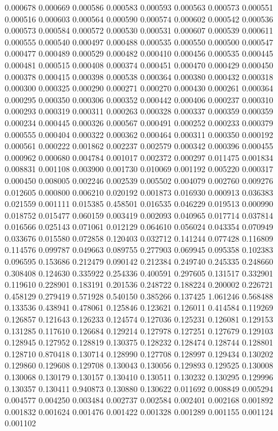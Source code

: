 0.000678
0.000669
0.000586
0.000583
0.000593
0.000563
0.000573
0.000551
0.000516
0.000603
0.000564
0.000590
0.000574
0.000602
0.000542
0.000536
0.000573
0.000584
0.000572
0.000530
0.000531
0.000607
0.000539
0.000611
0.000555
0.000540
0.000497
0.000488
0.000535
0.000550
0.000500
0.000547
0.000477
0.000489
0.000529
0.000482
0.000410
0.000456
0.000535
0.000445
0.000481
0.000515
0.000408
0.000374
0.000451
0.000470
0.000429
0.000450
0.000378
0.000415
0.000398
0.000538
0.000364
0.000380
0.000432
0.000318
0.000300
0.000325
0.000290
0.000271
0.000270
0.000430
0.000261
0.000364
0.000295
0.000350
0.000306
0.000352
0.000442
0.000406
0.000237
0.000310
0.000293
0.000319
0.000311
0.000263
0.000328
0.000337
0.000359
0.000359
0.000234
0.000445
0.000326
0.000567
0.000491
0.000252
0.000233
0.000379
0.000555
0.000404
0.000322
0.000362
0.000464
0.000311
0.000350
0.000192
0.000561
0.000222
0.001862
0.002237
0.002579
0.000342
0.000396
0.000455
0.000962
0.000680
0.004784
0.001017
0.002372
0.000297
0.011475
0.001834
0.008831
0.001108
0.003900
0.001730
0.010069
0.001192
0.005220
0.000317
0.000450
0.008005
0.002246
0.002539
0.005502
0.004079
0.002760
0.009276
0.012605
0.000800
0.006210
0.020192
0.001873
0.016930
0.000913
0.036383
0.021559
0.001111
0.015385
0.458501
0.016535
0.046229
0.019513
0.000990
0.018752
0.015477
0.060159
0.003419
0.002093
0.040965
0.017714
0.037814
0.016566
0.025143
0.071061
0.012129
0.064610
0.056024
0.043354
0.070949
0.033676
0.015580
0.072858
0.120403
0.032712
0.141244
0.077428
0.116809
0.114576
0.099787
0.049663
0.089755
0.277903
0.069945
0.095358
0.102383
0.096595
0.153686
0.212479
0.090142
0.212384
0.249740
0.245335
0.248660
0.308408
0.124630
0.335922
0.254336
0.400591
0.297605
0.131517
0.332901
0.119610
0.228901
0.183191
0.201536
0.248722
0.188224
0.200002
0.226721
0.458129
0.279419
0.571928
0.540150
0.385266
0.137425
1.061246
0.568488
0.133536
0.438941
0.478061
0.125846
0.123621
0.126011
0.414584
0.119269
0.126857
0.121643
0.126233
0.124574
0.127036
0.125231
0.126081
0.129153
0.131285
0.117610
0.126684
0.129214
0.127978
0.127251
0.127679
0.129103
0.128945
0.127952
0.128819
0.130375
0.128232
0.128474
0.128744
0.128801
0.128710
0.870418
0.130714
0.128990
0.127708
0.128997
0.129434
0.130202
0.129860
0.129608
0.129708
0.130043
0.130056
0.129893
0.129525
0.130008
0.130068
0.130179
0.130157
0.130410
0.130511
0.130232
0.130295
0.129996
0.130357
0.130411
0.940873
0.130880
0.130622
0.011692
0.008849
0.005294
0.004577
0.004250
0.003484
0.002737
0.002584
0.002401
0.002168
0.001892
0.001832
0.001624
0.001476
0.001422
0.001328
0.001289
0.001155
0.001124
0.001102
